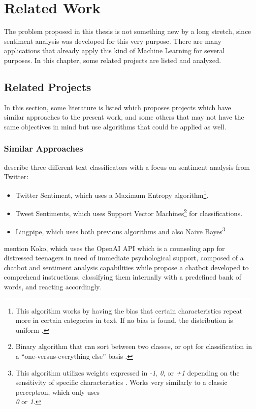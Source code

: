 \chapter{Related Work}
\label{ch3}
The problem proposed in this thesis is not something new by a long stretch, since sentiment analysis was developed for this very purpose. There are many applications that already apply this kind of Machine Learning for several purposes. In this chapter, some related projects are listed and analyzed.

\section{Related Projects}
In this section, some literature is listed which proposes projects which have similar approaches to the present work, and some others that may not have the same objectives in mind but use algorithms that could be applied as well.
\subsection{Similar Approaches}
\citet{rf10} describe three different text classificators with a focus on sentiment analysis from Twitter:\\ 
\begin{itemize}
\item Twitter Sentiment, which uses a Maximum Entropy algorithm\footnote{This algorithm works by having the bias that certain characteristics repeat more in certain categories in text. If no bias is found, the distribution is uniform \citep{rf17}.}.
\item Tweet Sentiments, which uses Support Vector Machines\footnote{Binary algorithm that can sort between two classes, or opt for classification in a ``one-versus-everything else'' basis \citep{rf18}.} for classifications.
\item Lingpipe, which uses both previous algorithms and also Naive Bayes\footnote{This algorithm utilizes weights expressed in \textit{-1}, \textit{0}, or \textit{+1} depending on the sensitivity of specific characteristics \citep{rf19}. Works very similarly to a classic perceptron, which only uses\\ \textit{0} or \textit{1}.}
\end{itemize}
\citet{rf6} mention Koko, which uses the OpenAI API which is a counseling app for distressed teenagers in need of immediate psychological support, composed of a chatbot and sentiment analysis capabilities while
\citet{rf14} propose a chatbot developed to comprehend instructions, classifying them internally with a predefined bank of words, and reacting accordingly.

